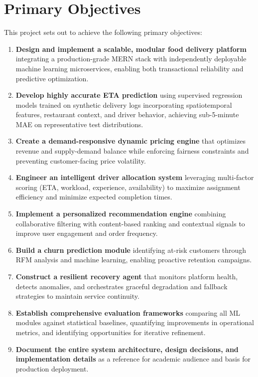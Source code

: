 \documentclass[12pt,a4paper]{report}
\begin{document}
\section{Primary Objectives}

This project sets out to achieve the following primary objectives:

\begin{enumerate}
    \item \textbf{Design and implement a scalable, modular food delivery platform} integrating a production-grade MERN stack with independently deployable machine learning microservices, enabling both transactional reliability and predictive optimization.
    
    \item \textbf{Develop highly accurate ETA prediction} using supervised regression models trained on synthetic delivery logs incorporating spatiotemporal features, restaurant context, and driver behavior, achieving sub-5-minute MAE on representative test distributions.
    
    \item \textbf{Create a demand-responsive dynamic pricing engine} that optimizes revenue and supply-demand balance while enforcing fairness constraints and preventing customer-facing price volatility.
    
    \item \textbf{Engineer an intelligent driver allocation system} leveraging multi-factor scoring (ETA, workload, experience, availability) to maximize assignment efficiency and minimize expected completion times.
    
    \item \textbf{Implement a personalized recommendation engine} combining collaborative filtering with content-based ranking and contextual signals to improve user engagement and order frequency.
    
    \item \textbf{Build a churn prediction module} identifying at-risk customers through RFM analysis and machine learning, enabling proactive retention campaigns.
    
    \item \textbf{Construct a resilient recovery agent} that monitors platform health, detects anomalies, and orchestrates graceful degradation and fallback strategies to maintain service continuity.
    
    \item \textbf{Establish comprehensive evaluation frameworks} comparing all ML modules against statistical baselines, quantifying improvements in operational metrics, and identifying opportunities for iterative refinement.
    
    \item \textbf{Document the entire system architecture, design decisions, and implementation details} as a reference for academic audience and basis for production deployment.
\end{enumerate}
\end{document}
